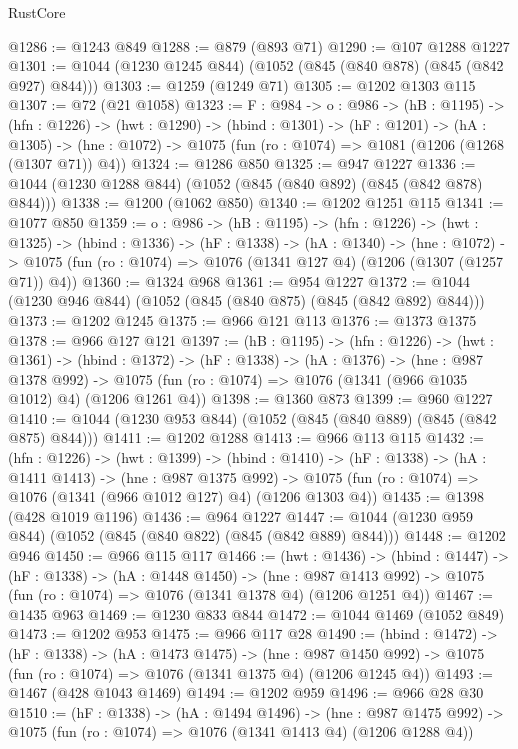 \begin{lexlean}{RustCore}
\begin{coremodule}
@1286 := @1243 @849
@1288 := @879 (@893 @71)
@1290 := @107 @1288 @1227
@1301 := @1044 (@1230 @1245 @844) (@1052 (@845 (@840 @878) (@845 (@842 @927) @844)))
@1303 := @1259 (@1249 @71)
@1305 := @1202 @1303 @115
@1307 := @72 (@21 @1058)
@1323 := {F : @984} ->
  {o : @986} ->
  (hB : @1195) ->
  (hfn : @1226) ->
  (hwt : @1290) ->
  (hbind : @1301) ->
  (hF : @1201) ->
  (hA : @1305) -> (hne : @1072) -> @1075 (fun (ro : @1074) => @1081 (@1206 (@1268 (@1307 @71)) @4))
@1324 := @1286 @850
@1325 := @947 @1227
@1336 := @1044 (@1230 @1288 @844) (@1052 (@845 (@840 @892) (@845 (@842 @878) @844)))
@1338 := @1200 (@1062 @850)
@1340 := @1202 @1251 @115
@1341 := @1077 @850
@1359 := {o : @986} ->
  (hB : @1195) ->
  (hfn : @1226) ->
  (hwt : @1325) ->
  (hbind : @1336) ->
  (hF : @1338) ->
  (hA : @1340) ->
  (hne : @1072) -> @1075 (fun (ro : @1074) => @1076 (@1341 @127 @4) (@1206 (@1307 (@1257 @71)) @4))
@1360 := @1324 @968
@1361 := @954 @1227
@1372 := @1044 (@1230 @946 @844) (@1052 (@845 (@840 @875) (@845 (@842 @892) @844)))
@1373 := @1202 @1245
@1375 := @966 @121 @113
@1376 := @1373 @1375
@1378 := @966 @127 @121
@1397 := (hB : @1195) ->
  (hfn : @1226) ->
  (hwt : @1361) ->
  (hbind : @1372) ->
  (hF : @1338) ->
  (hA : @1376) ->
  (hne : @987 @1378 @992) ->
  @1075 (fun (ro : @1074) => @1076 (@1341 (@966 @1035 @1012) @4) (@1206 @1261 @4))
@1398 := @1360 @873
@1399 := @960 @1227
@1410 := @1044 (@1230 @953 @844) (@1052 (@845 (@840 @889) (@845 (@842 @875) @844)))
@1411 := @1202 @1288
@1413 := @966 @113 @115
@1432 := (hfn : @1226) ->
  (hwt : @1399) ->
  (hbind : @1410) ->
  (hF : @1338) ->
  (hA : @1411 @1413) ->
  (hne : @987 @1375 @992) ->
  @1075 (fun (ro : @1074) => @1076 (@1341 (@966 @1012 @127) @4) (@1206 @1303 @4))
@1435 := @1398 (@428 @1019 @1196)
@1436 := @964 @1227
@1447 := @1044 (@1230 @959 @844) (@1052 (@845 (@840 @822) (@845 (@842 @889) @844)))
@1448 := @1202 @946
@1450 := @966 @115 @117
@1466 := (hwt : @1436) ->
  (hbind : @1447) ->
  (hF : @1338) ->
  (hA : @1448 @1450) ->
  (hne : @987 @1413 @992) -> @1075 (fun (ro : @1074) => @1076 (@1341 @1378 @4) (@1206 @1251 @4))
@1467 := @1435 @963
@1469 := @1230 @833 @844
@1472 := @1044 @1469 (@1052 @849)
@1473 := @1202 @953
@1475 := @966 @117 @28
@1490 := (hbind : @1472) ->
  (hF : @1338) ->
  (hA : @1473 @1475) ->
  (hne : @987 @1450 @992) -> @1075 (fun (ro : @1074) => @1076 (@1341 @1375 @4) (@1206 @1245 @4))
@1493 := @1467 (@428 @1043 @1469)
@1494 := @1202 @959
@1496 := @966 @28 @30
@1510 := (hF : @1338) ->
  (hA : @1494 @1496) ->
  (hne : @987 @1475 @992) -> @1075 (fun (ro : @1074) => @1076 (@1341 @1413 @4) (@1206 @1288 @4))

\end{coremodule}
\end{lexlean}
